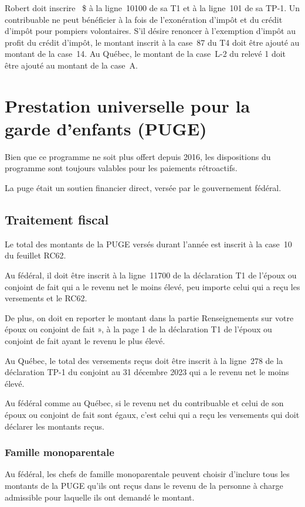 Robert doit inscrire ~\$ à la ligne~10100 de sa T1 et à la ligne~101 de sa TP-1. Un contribuable ne peut bénéficier à la fois de l'exonération d'impôt et du crédit d'impôt pour pompiers volontaires. S'il désire renoncer à l'exemption d'impôt au profit du crédit d'impôt, le montant inscrit à la case~87 du T4 doit être ajouté au montant de la case~14. Au Québec, le montant de la case~L-2 du relevé 1 doit être ajouté au montant de la case~A.



\section{Prestation universelle pour la garde d'enfants (PUGE)}
\begin{intro}
	Bien que ce programme ne soit plus offert depuis 2016, les dispositions du programme sont toujours valables pour les paiements rétroactifs.
\end{intro}
La \acrfull{puge} était un soutien financier direct, versée par le gouvernement fédéral.


\subsection{Traitement fiscal}
Le total des montants de la PUGE versés durant l'année est inscrit à la case~10 du feuillet RC62. 

Au fédéral, il doit être inscrit à la ligne~11700 de la déclaration T1 de l'époux ou conjoint de fait qui a le revenu net le moins élevé, peu importe celui qui a reçu les versements et le RC62. 

De plus, on doit en reporter le montant dans la partie \og Renseignements sur votre époux ou conjoint de fait », à la page 1 de la déclaration T1 de l'époux ou conjoint de fait ayant le revenu le plus élevé.

Au Québec, le total des versements reçus doit être inscrit à la ligne~278 de la déclaration TP-1 du conjoint au 31 décembre 2023 qui a le revenu net le moins élevé.

Au fédéral comme au Québec, si le revenu net du contribuable et celui de son époux ou conjoint de fait sont égaux, c'est celui qui a reçu les versements qui doit déclarer les montants reçus.

\subsubsection{Famille monoparentale}
Au fédéral, les chefs de famille monoparentale peuvent choisir d'inclure tous les montants de la PUGE qu'ils ont reçus dans le revenu de la personne à charge admissible pour laquelle ils ont demandé le montant.

